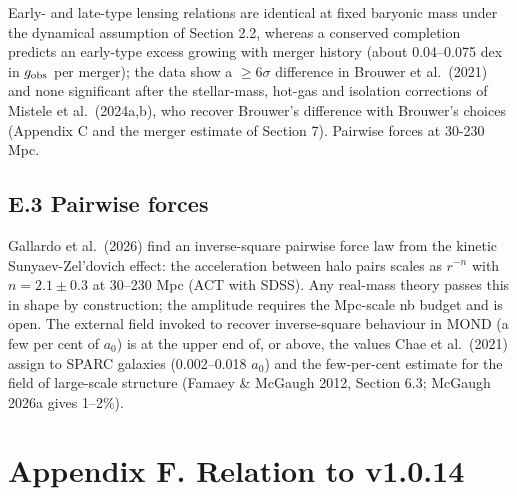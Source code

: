 \documentclass[
  10pt,
]{article}
\begin{document}
Early- and late-type lensing relations are identical at fixed baryonic mass under the dynamical assumption of Section 2.2, whereas a conserved completion predicts an early-type excess growing with merger history (about 0.04--0.075 dex in $g_{\rm obs}$ per merger); the data show a $\ge6\sigma$ difference in Brouwer et al.~(2021) and none significant after the stellar-mass, hot-gas and isolation corrections of Mistele et al.~(2024a,b), who recover Brouwer's difference with Brouwer's choices (Appendix C and the merger estimate of Section 7). Pairwise forces at 30-230 Mpc.

\subsection{E.3 Pairwise forces}

Gallardo et al.~(2026) find an inverse-square pairwise force law from the kinetic Sunyaev-Zel'dovich effect: the acceleration between halo pairs scales as $r^{-n}$ with $n=2.1\pm0.3$ at 30--230 Mpc (ACT with SDSS). Any real-mass theory passes this
in shape by construction; the amplitude requires the Mpc-scale nb budget
and is open. The external field invoked to recover inverse-square behaviour in MOND (a few per cent of $a_0$) is at the upper end of, or above, the values Chae et al.~(2021) assign to SPARC galaxies (0.002--0.018 $a_0$) and the few-per-cent estimate for the field of large-scale structure (Famaey \& McGaugh 2012, Section 6.3; McGaugh 2026a gives 1--2\%).

\section{Appendix F. Relation to v1.0.14}\label{appendix-f.-relation-to-v1.0.14}
\end{document}
